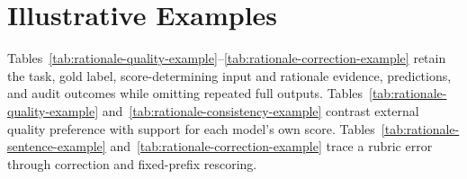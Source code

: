 \begin{table}[!t]
\hfuzz=2pt
\centering
\begin{minipage}{\linewidth}
\section{Illustrative Examples}
\label{app:rationale-analysis}
Tables~\ref{tab:rationale-quality-example}--\ref{tab:rationale-correction-example}
retain the task, gold label, score-determining input and rationale evidence,
predictions, and audit outcomes while omitting repeated full outputs.
Tables~\ref{tab:rationale-quality-example} and~\ref{tab:rationale-consistency-example} contrast external quality preference with support for each model's own score. Tables~\ref{tab:rationale-sentence-example} and~\ref{tab:rationale-correction-example} trace a rubric error through correction and fixed-prefix rescoring.
\end{minipage}


\end{table}
